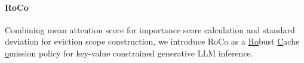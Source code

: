 \paragraph{RoCo} Combining mean attention score for importance score calculation and standard deviation for eviction scope construction, we introduce RoCo as a \underline{R}\underline{o}bust \underline{C}ache \underline{o}mission policy for key-value constrained generative LLM inference.
